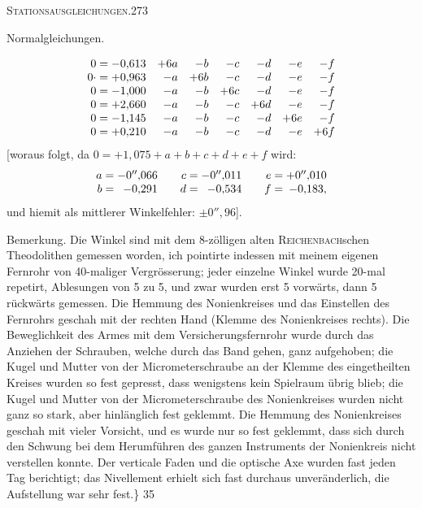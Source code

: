 \clearpage
\noindent\mbox{}\hfill\textsc{Stationsausgleichungen.}\hfill273\par\medskip
\begin{center}Normalgleichungen.\end{center}
\[
\begin{array}{r@{\;}c@{\;}rrrrrrr}
0&=&-0{,}613&+6a&-b&-c&-d&-e&-f\\
0\mathord{\cdot}&=&+0{,}963&-a&+6b&-c&-d&-e&-f\\
0&=&-1{,}000&-a&-b&+6c&-d&-e&-f\\
0&=&+2{,}660&-a&-b&-c&+6d&-e&-f\\
0&=&-1{,}145&-a&-b&-c&-d&+6e&-f\\
0&=&+0{,}210&-a&-b&-c&-d&-e&+6f
\end{array}
\]
[woraus folgt, da $0=+1{,}075+a+b+c+d+e+f$ wird:
\[
\begin{array}{r@{\;}c@{\;}r@{\qquad}r@{\;}c@{\;}r@{\qquad}r@{\;}c@{\;}r}
a&=&-0''{,}066&c&=&-0''{,}011&e&=&+0''{,}010\\
b&=&-0{,}291&d&=&-0{,}534&f&=&-0{,}183,
\end{array}
\]
und hiemit als mittlerer Winkelfehler: $\pm0''{,}96$].

Bemerkung. Die Winkel sind mit dem 8-zölligen alten \textsc{Reichenbach}schen Theodolithen gemessen worden, ich pointirte indessen mit meinem eigenen Fernrohr von 40-maliger Vergrösserung; jeder einzelne Winkel wurde 20-mal repetirt, Ablesungen von 5 zu 5, und zwar wurden erst 5 vorwärts, dann 5 rückwärts gemessen. Die Hemmung des Nonienkreises und das Einstellen des Fernrohrs geschah mit der rechten Hand (Klemme des Nonienkreises rechts). Die Beweglichkeit des Armes mit dem Versicherungsfernrohr wurde durch das Anziehen der Schrauben, welche durch das Band gehen, ganz aufgehoben; die Kugel und Mutter von der Micrometerschraube an der Klemme des eingetheilten Kreises wurden so fest gepresst, dass wenigstens kein Spielraum übrig blieb; die Kugel und Mutter von der Micrometerschraube des Nonienkreises wurden nicht ganz so stark, aber hinlänglich fest geklemmt. Die Hemmung des Nonienkreises geschah mit vieler Vorsicht, und es wurde nur so fest geklemmt, dass sich durch den Schwung bei dem Herumführen des ganzen Instruments der Nonienkreis nicht verstellen konnte. Der verticale Faden und die optische Axe wurden fast jeden Tag berichtigt; das Nivellement erhielt sich fast durchaus unveränderlich, die Aufstellung war sehr fest.\}
\vfill
{}\hfill35

